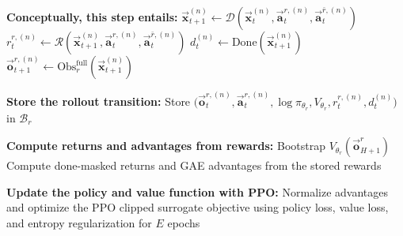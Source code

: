 \begin{algorithm}[H]
\begin{algorithmic}[1]
    \State \textbf{Conceptually, this step entails:}
    \State \hspace{2em} $\vec{\mathbf{x}}_{t+1}^{(n)} \leftarrow \mathcal{D}\!\left(\vec{\mathbf{x}}_t^{(n)}, \vec{\mathbf{a}}_t^{r,(n)}, \vec{\mathbf{a}}_t^{\bar r,(n)}\right)$
    \State \hspace{2em} $r_t^{r,(n)} \leftarrow \mathcal{R}\!\left(\vec{\mathbf{x}}_{t+1}^{(n)}, \vec{\mathbf{a}}_t^{r,(n)}, \vec{\mathbf{a}}_t^{\bar r,(n)}\right)$
    \State \hspace{2em} $d_t^{(n)} \leftarrow \mathrm{Done}\!\left(\vec{\mathbf{x}}_{t+1}^{(n)}\right)$
    \State \hspace{2em} $\vec{\mathbf{o}}_{t+1}^{r,(n)} \leftarrow \mathrm{Obs}^{\mathrm{full}}_r(\vec{\mathbf{x}}_{t+1}^{(n)})$

    \State \textbf{Store the rollout transition:}
    \State \hspace{1em} Store $\big(\vec{\mathbf{o}}_t^{r,(n)}, \vec{\mathbf{a}}_t^{r,(n)}, \log \pi_{\theta_r}, V_{\theta_r}, r_t^{r,(n)}, d_t^{(n)}\big)$ in $\mathcal{B}_r$
  \EndFor

  \State \textbf{Compute returns and advantages from rewards:}
  \State \hspace{1em} Bootstrap $V_{\theta_r}(\vec{\mathbf{o}}_{H+1}^r)$
  \State \hspace{1em} Compute done-masked returns and GAE advantages from the stored rewards

  \State \textbf{Update the policy and value function with PPO:}
  \State \hspace{1em} Normalize advantages and optimize the PPO clipped surrogate objective
  \State \hspace{1em} using policy loss, value loss, and entropy regularization for $E$ epochs
\EndFor
\end{algorithmic}
\end{algorithm}

